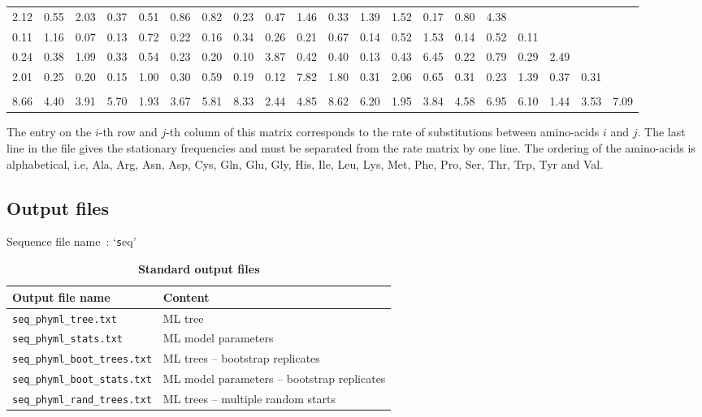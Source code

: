\documentclass[a4paper,12pt]{article}
\newcommand{\x}[1]{\texttt{#1}}
\begin{document}
\begin{center}
{\begin{tabular}{p{0.33cm}p{0.33cm}p{0.33cm}p{0.33cm}p{0.33cm}p{0.33cm}p{0.33cm}p{0.33cm}p{0.33cm}p{0.33cm}p{0.33cm}p{0.33cm}p{0.33cm}p{0.33cm}p{0.33cm}p{0.33cm}p{0.33cm}p{0.33cm}p{0.33cm}p{0.33cm}}
2.12 & 0.55 & 2.03 & 0.37 & 0.51 & 0.86 & 0.82 & 0.23 & 0.47 & 1.46 & 0.33 & 1.39 & 1.52 & 0.17 & 0.80 & 4.38 &  &&& \\
0.11 & 1.16 & 0.07 & 0.13 & 0.72 & 0.22 & 0.16 & 0.34 & 0.26 & 0.21 & 0.67 & 0.14 & 0.52 & 1.53 & 0.14 & 0.52 & 0.11 &  && \\
0.24 & 0.38 & 1.09 & 0.33 & 0.54 & 0.23 & 0.20 & 0.10 & 3.87 & 0.42 & 0.40 & 0.13 & 0.43 & 6.45 & 0.22 & 0.79 & 0.29 & 2.49 &   & \\
2.01 & 0.25 & 0.20 & 0.15 & 1.00 & 0.30 & 0.59 & 0.19 & 0.12 & 7.82 & 1.80 & 0.31 & 2.06 & 0.65 & 0.31 & 0.23 & 1.39 & 0.37 & 0.31 &   \\
\\
8.66 & 4.40 & 3.91 & 5.70 & 1.93 & 3.67 & 5.81 & 8.33 & 2.44 & 4.85 & 8.62 & 6.20 & 1.95 & 3.84 & 4.58 & 6.95 & 6.10 & 1.44 & 3.53 & 7.09  \\
\end{tabular}
}
\end{center}

The  entry  on the  $i$-th  row  and  $j$-th  column of  this  matrix  corresponds  to the  rate  of
substitutions between  amino-acids $i$  and $j$.   The last line  in the  file gives  the stationary
frequencies and must be separated from the rate  matrix by one line. The ordering of the amino-acids
is alphabetical,  i.e, Ala, Arg, Asn, Asp,  Cys, Gln, Glu, Gly,  His, Ile, Leu, Lys,  Met, Phe, Pro,
Ser, Thr, Trp, Tyr and Val.

\subsection{Output files}

\begin{table}
Sequence file name~: `{\x seq}'\\
\begin{center}
\begin{tabular}{ll}
\hline
Output file name & Content \\
\hline
\x{seq\_phyml\_tree.txt} & ML tree\\
\x{seq\_phyml\_stats.txt} &  ML model parameters\\
\x{seq\_phyml\_boot\_trees.txt} & ML trees -- bootstrap replicates\\
\x{seq\_phyml\_boot\_stats.txt} & ML model parameters -- bootstrap replicates \\
\x{seq\_phyml\_rand\_trees.txt} & ML trees -- multiple random starts\\
\hline
\end{tabular}
\end{center}
\caption{{\bf Standard output files}}\label{tab:output}
\end{table}
\end{document}
